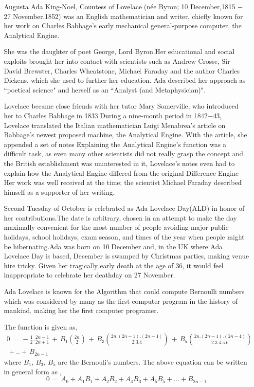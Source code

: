 \documentclass[fleqn,letterpaper,12pt]{report}
\begin{document}
\assignmenttitle

%
{}
\problem
Augusta Ada King-Noel, Countess of Lovelace (née Byron; 10 December,1815 $-$ 27 November,1852) was an English mathematician and writer, chiefly known for her work on Charles Babbage's early mechanical general-purpose computer, the Analytical Engine.

She was the daughter of poet George, Lord Byron.Her educational and social exploits brought her into contact with scientists such as Andrew Crosse, Sir David Brewster, Charles Wheatstone, Michael Faraday and the author Charles Dickens, which she used to further her education. Ada described her approach as ``poetical science" and herself as an ``Analyst (and Metaphysician)".

Lovelace became close friends with her tutor Mary Somerville, who introduced her to Charles Babbage in 1833.During a nine-month period in 1842$-$43, Lovelace translated the Italian mathematician Luigi Menabrea's article on Babbage's newest proposed machine, the Analytical Engine. With the article, she appended a set of notes Explaining the Analytical Engine's function was a difficult task, as even many other scientists did not really grasp the concept and the British establishment was uninterested in it, Lovelace's notes even had to explain how the Analytical Engine differed from the original Difference Engine Her work was well received at the time; the scientist Michael Faraday described himself as a supporter of her writing.

Second Tuesday of October is celebrated as Ada Lovelace Day(ALD) in honor of her contributions.The date is arbitrary, chosen in an attempt to make the day maximally convenient for the most number of people avoiding major public holidays, school holidays, exam season, and times of the year when people might be hibernating.Ada was born on 10 December and, in the UK where Ada Lovelace Day is based, December is swamped by Christmas parties, making venue hire tricky. Given her tragically early death at the age of 36, it would feel inappropriate to celebrate her deathday on 27 November.\cite{ll}

Ada Lovelace is known for the Algorithm that could compute Bernoulli numbers which was considered by many as the first computer program in the history of mankind, making her the first computer programer.

The function is given as,
\begin{equation}
\begin{split}	
	0\,=\, -\frac{1}{2}.\frac{2n-1}{2n+1}\,+\,B_1\left(\frac{2n}{2}\right)\,+\,B_3\left(\frac{2n.(2n-1).(2n-1)}{2.3.4}\right)\,+\,B_5\left(\frac{2n.(2n-1).(2n-4)}{2.3.4.5.6}\right)\\
	\,+..+\,B_{2n-1}
	\end{split}
\end{equation}
where $B_1$, $B_3$, $B_5$ are the Bernouli's numbers. 
The above equation can be written in general form as ,
\begin{equation}
	0\,=\,A_0+ A_1B_1 + A_2B_2 + A_3B_3 + A_5B_5 
	+...+ B_{2n-1}
\end{equation}
\end{document}
